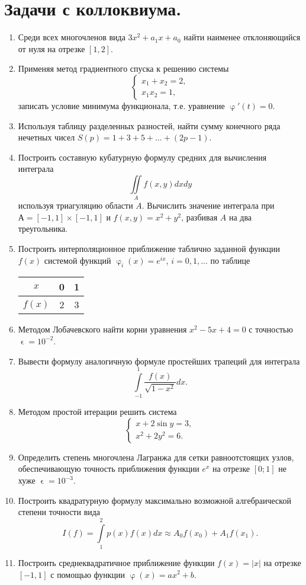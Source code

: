 \documentclass[a4paper, 12pt]{report}
\date{}
\renewcommand{\varphi}{\upvarphi}
\renewcommand{\phi}{\upvarphi}
\renewcommand{\epsilon}{\upvarepsilon}
\begin{document}
	\section*{Задачи с коллоквиума.}
	\begin{enumerate}
		\item Среди всех многочленов вида $3x^2+a_1x+a_0$ найти наименее отклоняющийся от нуля на отрезке $[1,2]$.
		\item Применяя метод градиентного спуска к решению системы $$\begin{cases}
		x_1+x_2 = 2,\\
		x_1x_2 = 1,
		\end{cases}$$
		записать условие минимума функционала, т.е. уравнение $\varphi'(t)=0$.
		\item Используя таблицу разделенных разностей, найти сумму конечного ряда нечетных чисел $S(p) = 1+3+5+\ldots + (2p-1)$.
		\item Построить составную кубатурную формулу средних для вычисления интеграла $$\iint\limits_A f(x,y) dxdy$$ используя триагуляцию области $A$. Вычислить значение интеграла при $А=[-1,1]\times[-1,1]$ и $f(x,y) = x^2+y^2$, разбивая $A$ на два треугольника.
		\item Построить интерполяционное приближение таблично заданной функции $f(x)$ системой функций $\phi_i(x)=e^{ix}$, $i=0,1,\ldots$ по таблице \begin{center}\begin{tabular}[t]{|c|c|c|}
				\hline
				$x$ & 0 & 1 \\
				\hline
				$f(x)$ & 2 & 3 \\
				\hline
		\end{tabular}\end{center}
	\item Методом Лобачевского найти корни уравнения $x^2-5x+4=0$ с точностью $\epsilon=10^{-2}$.
	\item Вывести формулу аналогичную формуле простейших трапеций для интеграла $$\int\limits_{-1}^1\dfrac{f(x)}{\sqrt{1-x^2}}dx.$$
	\item Методом простой итерации решить система 
	$$\begin{cases} 
		x+2\sin y=3,\\
		x^2+2y^2=6.
	\end{cases}$$
	\item Определить степень многочлена Лагранжа для сетки равноотстоящих узлов, обеспечивающую точность приближения функции $e^x$ на отрезке $[0; 1]$ не хуже $\epsilon=10^{-3}$.
	\item Построить квадратурную формулу максимально возможной алгебраической степени точности вида $$I(f) = \int\limits_1^2 p(x)f(x)dx\approx A_0f(x_0) + A_1f(x_1).$$
	\item Построить среднеквадратичное приближение функции $f(x) = |x|$ на отрезке $[-1, 1]$ с помощью функции $\varphi(x)=ax^2 + b$.
	\end{enumerate}
\end{document}

